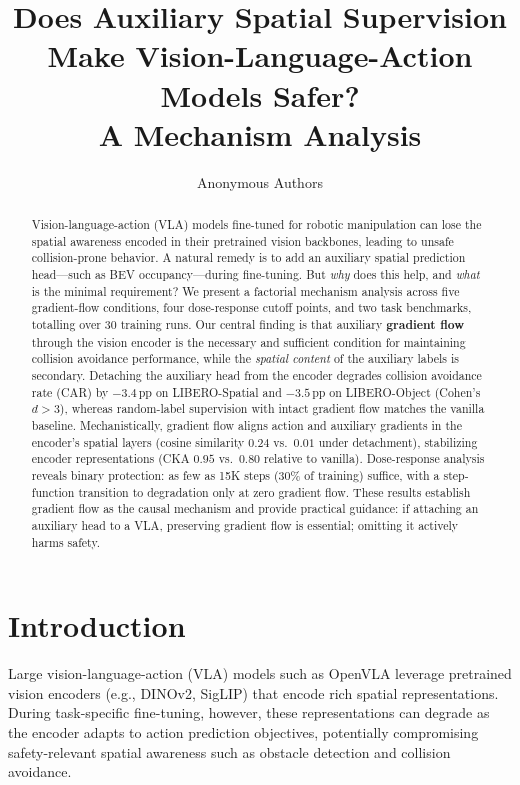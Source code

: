 \documentclass[letterpaper]{article}
\title{Does Auxiliary Spatial Supervision Make Vision-Language-Action Models Safer?\\ A Mechanism Analysis}
\author[1]{Anonymous Authors}
\affil[1]{Anonymous Institution}
\date{}
\begin{document}
\maketitle

\begin{abstract}
Vision-language-action (VLA) models fine-tuned for robotic manipulation can lose the spatial awareness encoded in their pretrained vision backbones, leading to unsafe collision-prone behavior. A natural remedy is to add an auxiliary spatial prediction head---such as BEV occupancy---during fine-tuning. But \emph{why} does this help, and \emph{what} is the minimal requirement? We present a factorial mechanism analysis across five gradient-flow conditions, four dose-response cutoff points, and two task benchmarks, totalling over 30 training runs. Our central finding is that auxiliary \textbf{gradient flow} through the vision encoder is the necessary and sufficient condition for maintaining collision avoidance performance, while the \emph{spatial content} of the auxiliary labels is secondary. Detaching the auxiliary head from the encoder degrades collision avoidance rate (CAR) by $-3.4$\,pp on LIBERO-Spatial and $-3.5$\,pp on LIBERO-Object (Cohen's $d > 3$), whereas random-label supervision with intact gradient flow matches the vanilla baseline. Mechanistically, gradient flow aligns action and auxiliary gradients in the encoder's spatial layers (cosine similarity $0.24$ vs.\ $0.01$ under detachment), stabilizing encoder representations (CKA $0.95$ vs.\ $0.80$ relative to vanilla). Dose-response analysis reveals binary protection: as few as 15K steps (30\% of training) suffice, with a step-function transition to degradation only at zero gradient flow. These results establish gradient flow as the causal mechanism and provide practical guidance: if attaching an auxiliary head to a VLA, preserving gradient flow is essential; omitting it actively harms safety.
\end{abstract}

\section{Introduction}
\label{sec:intro}

Large vision-language-action (VLA) models such as OpenVLA leverage pretrained vision encoders (e.g., DINOv2, SigLIP) that encode rich spatial representations. During task-specific fine-tuning, however, these representations can degrade as the encoder adapts to action prediction objectives, potentially compromising safety-relevant spatial awareness such as obstacle detection and collision avoidance.
\end{document}
